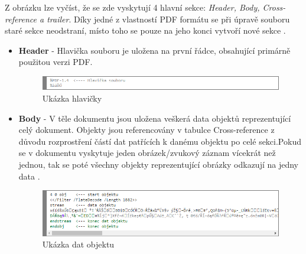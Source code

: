 Z obrázku lze vyčíst, že se zde vyskytují 4 hlavní sekce: \textit{Header, Body, Cross-reference a trailer}. Díky jedné z vlastností PDF formátu se při úpravě souboru staré sekce neodstraní, místo toho se pouze na jeho konci vytvoří nové sekce \cite{PDFInfoSec}.
\begin{itemize}
	\item \textbf{Header} - Hlavička souboru je uložena na první řádce, obsahující primárně použitou verzi PDF.
	\begin{figure}[h!]
	\centering
	\includegraphics[width=12cm]{img/pdf_hlavicka}
	\caption{Ukázka hlavičky}
	\label{fig:pdf_header}
	\end{figure}
	
	\item \textbf{Body} - V těle dokumentu jsou uložena veškerá data objektů reprezentující celý dokument. Objekty jsou referencovány v tabulce Cross-reference z důvodu rozprostření částí dat patřících k danému objektu po celé sekci.Pokud se v dokumentu vyskytuje jeden obrázek/zvukový záznam vícekrát než jednou, tak se poté všechny objekty reprezentující obrázky odkazují na jedny data \cite{PDFAdobe}.
	\begin{figure}[h!]
	\centering
	\includegraphics[width=12cm]{img/pdf_body}
	\caption{Ukázka dat objektu}
	\label{fig:pdf_body}
	\end{figure}


\end{itemize}
